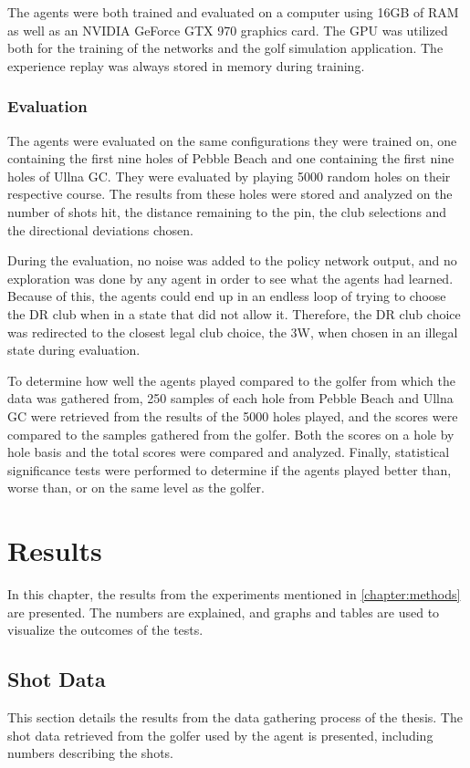 \documentclass{kththesis}
\begin{document}
The agents were both trained and evaluated on a computer using 16GB of RAM as well as an NVIDIA GeForce GTX 970 graphics card. The GPU was utilized both for the training of the networks and the golf simulation application. The experience replay was always stored in memory during training.

\subsection{Evaluation}
The agents were evaluated on the same configurations they were trained on, one containing the first nine holes of Pebble Beach and one containing the first nine holes of Ullna GC. They were evaluated by playing 5000 random holes on their respective course. The results from these holes were stored and analyzed on the number of shots hit, the distance remaining to the pin, the club selections and the directional deviations chosen.

During the evaluation, no noise was added to the policy network output, and no exploration was done by any agent in order to see what the agents had learned. Because of this, the agents could end up in an endless loop of trying to choose the DR club when in a state that did not allow it. Therefore, the DR club choice was redirected to the closest legal club choice, the 3W, when chosen in an illegal state during evaluation.

To determine how well the agents played compared to the golfer from which the data was gathered from, 250 samples of each hole from Pebble Beach and Ullna GC were retrieved from the results of the 5000 holes played, and the scores were compared to the samples gathered from the golfer. Both the scores on a hole by hole basis and the total scores were compared and analyzed. Finally, statistical significance tests were performed to determine if the agents played better than, worse than, or on the same level as the golfer.

\chapter{Results}
In this chapter, the results from the experiments mentioned in \autoref{chapter:methods} are presented. The numbers are explained, and graphs and tables are used to visualize the outcomes of the tests.

\section{Shot Data}
This section details the results from the data gathering process of the thesis. The shot data retrieved from the golfer used by the agent is presented, including numbers describing the shots.
\end{document}
